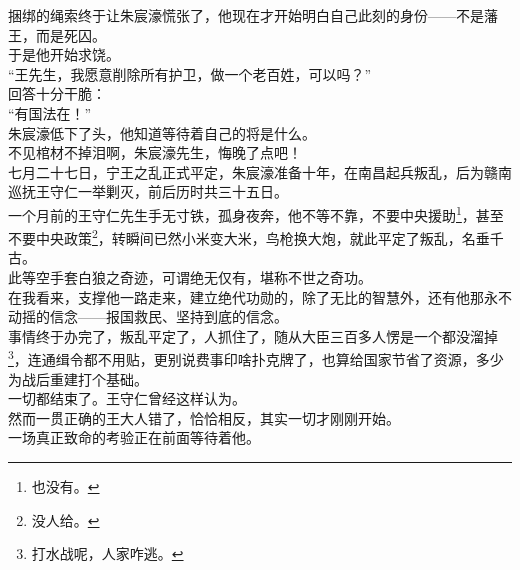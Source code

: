 \begin{multicols}{\theparacolNo}
捆绑的绳索终于让朱宸濠慌张了，他现在才开始明白自己此刻的身份——不是藩王，而是死囚。\\

于是他开始求饶。\\

“王先生，我愿意削除所有护卫，做一个老百姓，可以吗？”\\

回答十分干脆：\\

“有国法在！”\\

朱宸濠低下了头，他知道等待着自己的将是什么。\\

不见棺材不掉泪啊，朱宸濠先生，悔晚了点吧！\\

七月二十七日，宁王之乱正式平定，朱宸濠准备十年，在南昌起兵叛乱，后为赣南巡抚王守仁一举剿灭，前后历时共三十五日。\\

一个月前的王守仁先生手无寸铁，孤身夜奔，他不等不靠，不要中央援助\footnote{也没有。}，甚至不要中央政策\footnote{没人给。}，转瞬间已然小米变大米，鸟枪换大炮，就此平定了叛乱，名垂千古。\\

此等空手套白狼之奇迹，可谓绝无仅有，堪称不世之奇功。\\

在我看来，支撑他一路走来，建立绝代功勋的，除了无比的智慧外，还有他那永不动摇的信念——报国救民、坚持到底的信念。\\

事情终于办完了，叛乱平定了，人抓住了，随从大臣三百多人愣是一个都没溜掉\footnote{打水战呢，人家咋逃。}，连通缉令都不用贴，更别说费事印啥扑克牌了，也算给国家节省了资源，多少为战后重建打个基础。\\

一切都结束了。王守仁曾经这样认为。\\

然而一贯正确的王大人错了，恰恰相反，其实一切才刚刚开始。\\

一场真正致命的考验正在前面等待着他。\\
\ifnum{}
	\end{multicols}
\fi
\newpage
